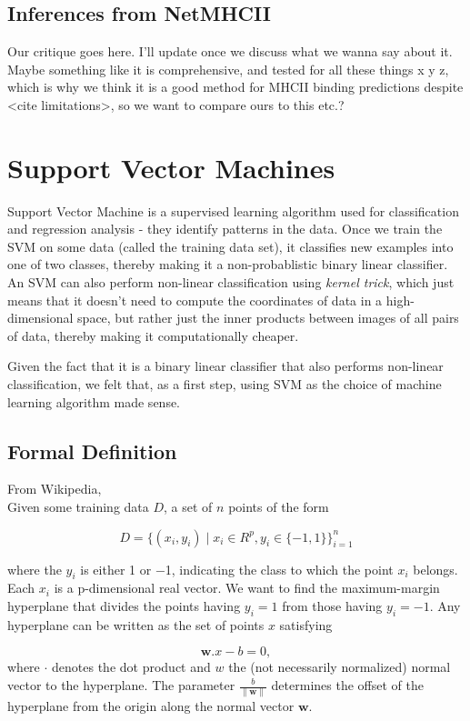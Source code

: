 \documentclass[journal]{IEEEtran}
\begin{document}
\subsection{Inferences from NetMHCII}
Our critique goes here. I'll update once we discuss what we wanna say about it. Maybe something like it is comprehensive, and tested for all these things x y z, which is why we think it is a good method for MHCII binding predictions despite <cite limitations>, so we want to compare ours to this etc.? 

\section{Support Vector Machines}
Support Vector Machine is a supervised learning algorithm used for classification and regression analysis - they identify patterns in the data. Once we train the SVM on some data (called the training data set), it classifies new examples into one of two classes, thereby making it a non-probablistic binary linear classifier. An SVM can also perform non-linear classification using \textit{kernel trick}, which just means that it doesn't need to compute the coordinates of data in a high-dimensional space, but rather just the inner products between images of all pairs of data, thereby making it computationally cheaper. 

Given the fact that it is a binary linear classifier that also performs non-linear classification, we felt that, as a first step, using SVM as the choice of machine learning algorithm made sense. 

\subsection{Formal Definition}

From Wikipedia,\\ 
Given some training data $D$, a set of $n$ points of the form 

$$
D =   \lbrace \left(x_{i}, y_{i}\right) \mid x_{i} \in R^{p}, y_{i} \in \lbrace-1, 1\rbrace\rbrace_{i=1}^n     
$$
    
where the $y_i$ is either 1 or −1, indicating the class to which the point $x_i$ belongs. Each $x_i$ is a p-dimensional real vector. We want to find the maximum-margin hyperplane that divides the points having $y_i=1$ from those having $y_i=-1$. Any hyperplane can be written as the set of points $x$ satisfying 

$$
\mathbf{w}.x - b = 0,
$$
where $\cdot$ denotes the dot product and $w$ the (not necessarily normalized) normal vector to the hyperplane. The parameter $\tfrac{b}{\|\mathbf{w}\|}$ determines the offset of the hyperplane from the origin along the normal vector ${\mathbf{w}}$.\\
\end{document}
